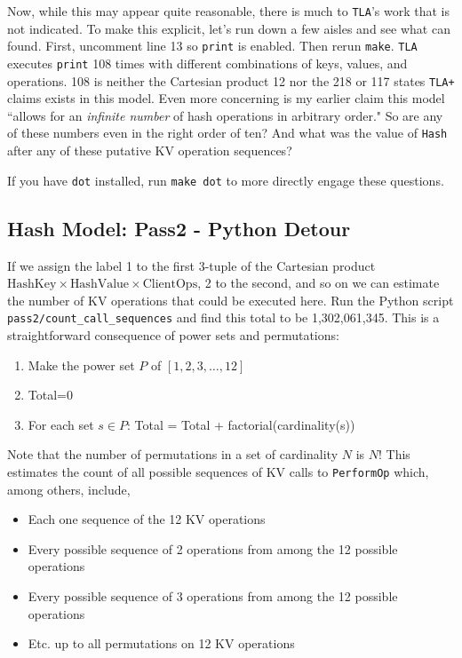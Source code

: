 \documentclass[twocolumn]{article}
\begin{document}
Now, while this may appear quite reasonable, there is much to \texttt{TLA}'s work that is not indicated. To make this explicit, let's run down a few aisles and see what can found. First, uncomment line 13 so \texttt{print} is enabled. Then rerun \texttt{make}. \texttt{TLA} executes \texttt{print} 108 times with different combinations of keys, values, and operations. 108 is neither the Cartesian product 12 nor the 218 or 117 states \texttt{TLA+} claims exists in this model. Even more concerning is my earlier claim this model ``allows for an \emph{infinite number} of hash operations in arbitrary order." So are any of these numbers even in the right order of ten? And what was the value of \texttt{Hash} after any of these putative KV operation sequences?

If you have \texttt{dot} installed, run \texttt{make dot} to more directly engage these questions.

\subsection{Hash Model: Pass2 - Python Detour}

If we assign the label 1 to the first 3-tuple of the Cartesian product $\text{HashKey} \times \text{HashValue} \times \text{ClientOps}$, 2 to the second, and so on we can estimate the number of KV operations that could be executed here. Run the Python script \texttt{pass2/count\_call\_sequences} and find this total to be 1,302,061,345. This is a straightforward consequence of power sets and permutations:

\begin{enumerate}
\item Make the power set $P$ of $[1,2,3,\ldots,12]$
\item Total=0
\item For each set $s \in P$: Total = Total + factorial(cardinality(s))
\end{enumerate}

Note that the number of permutations in a set of cardinality $N$ is $N!$ This estimates the count of all possible sequences of KV calls to \texttt{PerformOp} which, among others, include,

\begin{itemize}
\item Each one sequence of the 12 KV operations
\item Every possible sequence of 2 operations from among the 12 possible operations
\item Every possible sequence of 3 operations from among the 12 possible operations
\item Etc. up to all permutations on 12 KV operations
\end{itemize}
\end{document}
